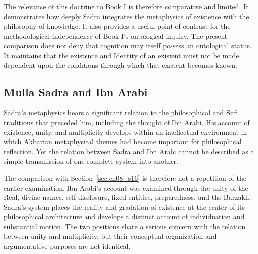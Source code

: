 \label{para:VS.B01.P01.C08.S17.SS13.P004}

The relevance of this doctrine
to Book I is therefore
comparative and limited.
It demonstrates how deeply
Sadra integrates the
metaphysics of existence
with the philosophy of
knowledge. It also provides
a useful point of contrast
for the methodological
independence of Book I's
ontological inquiry. The
present comparison does
not deny that cognition
may itself possess an
ontological status. It
maintains that the existence
and Identity of an existent
must not be made dependent
upon the conditions through
which that existent becomes
known.




\subsection{Mulla Sadra and Ibn Arabi}
\label{subsec:ch08_s17_ss14}

\label{para:VS.B01.P01.C08.S17.SS14.P001}

Sadra's metaphysics bears
a significant relation to
the philosophical and Sufi
traditions that preceded
him, including the thought
of Ibn Arabi. His account
of existence, unity, and
multiplicity develops within
an intellectual environment
in which Akbarian metaphysical
themes had become important
for philosophical reflection.
Yet the relation between
Sadra and Ibn Arabi cannot
be described as a simple
transmission of one complete
system into another.

\label{para:VS.B01.P01.C08.S17.SS14.P002}

The comparison with Section~\ref{sec:ch08_s16}
is therefore not a repetition
of the earlier examination.
Ibn Arabi's account was
examined through the unity
of the Real, divine names,
self-disclosure, fixed
entities, preparedness,
and the Barzakh. Sadra's
system places the reality
and gradation of existence
at the center of its
philosophical architecture
and develops a distinct
account of individuation
and substantial motion.
The two positions share
a serious concern with
the relation between unity
and multiplicity, but
their conceptual organization
and argumentative purposes
are not identical.


